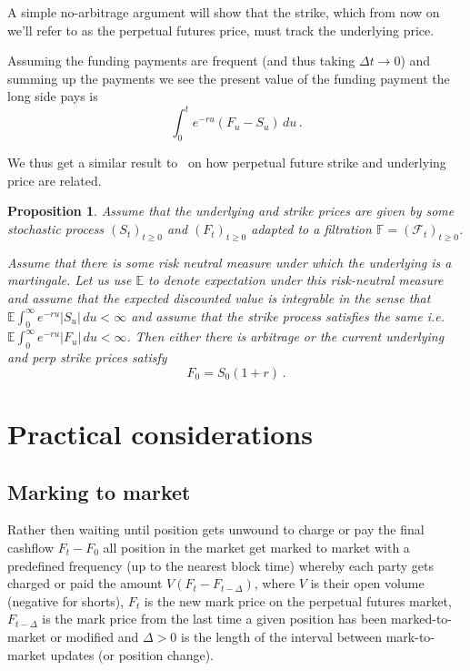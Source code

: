\documentclass[10pt]{article}
\newtheorem{proposition}{Proposition}
\begin{document}
A simple no-arbitrage argument will show that the strike, which from now on we'll refer to as the perpetual futures price, must track the underlying price. 

Assuming the funding payments are frequent (and thus taking $\Delta t \to 0$) and summing up the payments we see the present value of the funding payment the long side pays is 
\[
\int_0^t e^{-ru} (F_u - S_u)\,du\,.
\]

We thus get a similar result to~\cite{he:fundamentals} on how perpetual future strike and underlying price are related.

\begin{proposition}
\label{prop price tracking}
Assume that the underlying and strike prices are given by some stochastic process $(S_t)_{t\geq 0}$ and $(F_t)_{t\geq 0}$ adapted to a filtration $\mathbb F = (\mathcal F_t)_{t\geq 0}$.



Assume that there is some risk neutral measure under which the underlying is a martingale. 
Let us use $\mathbb E$ to denote expectation under this risk-neutral measure
and assume that the expected discounted value is integrable in the sense that $\mathbb E \int_0^\infty e^{-ru} |S_u|\,du < \infty$ and assume that the strike process satisfies the same i.e. $\mathbb E\int_0^\infty e^{-ru} |F_u|\,du < \infty$. 
Then either there is arbitrage or the current underlying and perp strike prices satisfy 
\[
F_0 = S_0(1+r)\,.
\]
\end{proposition}

\section{Practical considerations}

\subsection{Marking to market}
Rather then waiting until position gets unwound to charge or pay the final cashflow $F_t-F_0$ all position in the market get marked to market
with a predefined frequency (up to the nearest block time) whereby each party gets charged or paid 
the amount $V(F_t-F_{t-\Delta})$, where $V$ is their open volume (negative for shorts), 
$F_t$ is the new mark price on the perpetual futures market, $F_{t-\Delta}$ is the mark price from the last time a given position has been marked-to-market or modified
and $\Delta>0$ is the length of the interval between mark-to-market updates (or position change).
\end{document}
